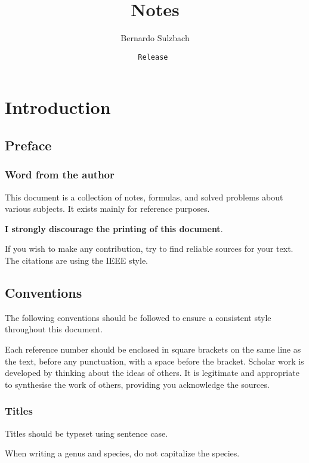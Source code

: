 \documentclass[12pt, oneside]{book}
\title{\Huge Notes}
\author{Bernardo Sulzbach}
\date{\texttt{Release }}
\begin{document}
\hypersetup{pageanchor=false} %
\begin{titlepage}
\maketitle
\end{titlepage}
\hypersetup{pageanchor=true}

\tableofcontents

\part{Introduction}
\chapter{Preface}
\section{Word from the author}

This document is a collection of notes, formulas, and solved problems about various subjects. It exists mainly for reference purposes.

\textbf{I strongly discourage the printing of this document}.

If you wish to make any contribution, try to find reliable sources for your text. The citations are using the IEEE style.

\chapter{Conventions}

The following conventions should be followed to ensure a consistent style throughout this document.

Each reference number should be enclosed in square brackets on the same line as the text, before any punctuation, with a space before the bracket.
Scholar work is developed by thinking about the ideas of others.
It is legitimate and appropriate to synthesise the work of others, providing you acknowledge the sources.

\section{Titles}

Titles should be typeset using sentence case.

When writing a genus and species, do not capitalize the species.
\end{document}
